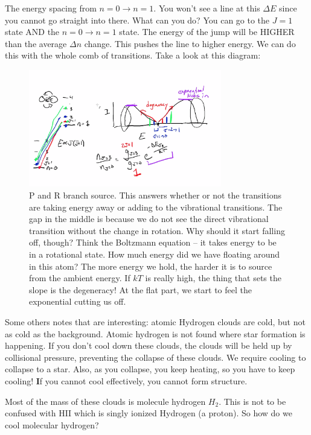 \documentclass{article}
\begin{document}
The energy spacing from $n= 0 \rightarrow n =1$. You won't see a line at this $\Delta E$ since you cannot go straight into there. What can you do? You can go to the $J=1$ state AND the $n=0 \rightarrow n = 1$ state. The energy of the jump will be HIGHER than the average $\Delta n$ change. This pushes the line to higher energy. We can do this with the whole comb of transitions. Take a look at this diagram:

\begin{figure}
    \centering
    \includegraphics[width=0.75\textwidth]{figures/Screen Shot 2020-10-01 at 11.29.37 AM.png}
    \caption{P and R branch source. This answers whether or not the transitions are taking energy away or adding to the vibrational transitions. The gap in the middle is because we do not see the direct vibrational transition without the change in rotation. Why should it start falling off, though? Think the Boltzmann equation -- it takes energy to be in a rotational state. How much energy did we have floating around in this atom? The more energy we hold, the harder it is to source from the ambient energy. If $kT$ is really high, the thing that sets the slope is the degeneracy! At the flat part, we start to feel the exponential cutting us off. }
    \label{fig:ro_explanation}
\end{figure}

Some others notes that are interesting: atomic Hydrogen clouds are cold, but not as cold as the background. Atomic hydrogen is not found where star formation is happening. If you don't cool down these clouds, the clouds will be held up by collisional pressure, preventing the collapse of these clouds. We require cooling to collapse to a star. Also, as you collapse, you keep heating, so you have to keep cooling! {\textbf If you cannot cool effectively, you cannot form structure.}

Most of the mass of these clouds is molecule hydrogen $H_2$. This is not to be confused with HII which is singly ionized Hydrogen (a proton). So how do we cool molecular hydrogen?
\end{document}
